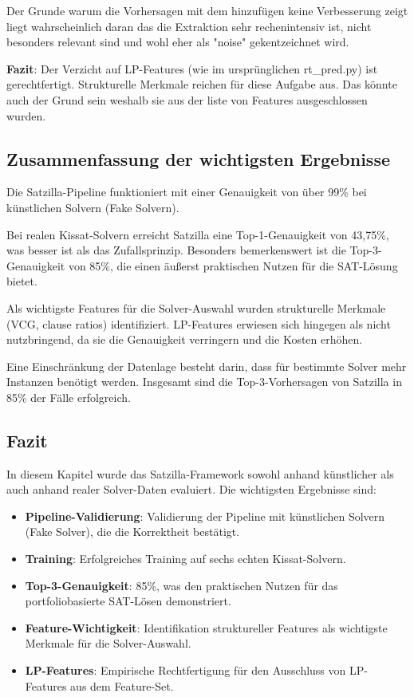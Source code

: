 Der Grunde warum die Vorhersagen mit dem hinzufügen keine Verbesserung zeigt liegt wahrscheinlich daran 
das die Extraktion sehr rechenintensiv ist, nicht besonders relevant sind und wohl eher als "noise" gekentzeichnet wird.

\textbf{Fazit}: Der Verzicht auf LP-Features (wie im ursprünglichen rt\_pred.py) ist gerechtfertigt. Strukturelle 
Merkmale reichen für diese Aufgabe aus. Das könnte auch der Grund sein weshalb sie aus der liste von 
Features ausgeschlossen wurden.

\newpage

\subsection{Zusammenfassung der wichtigsten Ergebnisse}

Die Satzilla-Pipeline funktioniert mit einer Genauigkeit von über 99\% bei künstlichen Solvern (Fake Solvern). 

Bei realen Kissat-Solvern erreicht Satzilla eine Top-1-Genauigkeit von 43,75\%, was besser ist als das Zufallsprinzip. Besonders bemerkenswert ist die Top-3-Genauigkeit von 85\%, die einen äußerst praktischen Nutzen für die SAT-Lösung bietet. 

Als wichtigste Features für die Solver-Auswahl wurden strukturelle Merkmale (VCG, clause ratios) identifiziert. LP-Features erwiesen sich hingegen als nicht nutzbringend, da sie die Genauigkeit verringern und die Kosten erhöhen. 

Eine Einschränkung der Datenlage besteht darin, dass für bestimmte Solver mehr Instanzen benötigt werden. Insgesamt sind die Top-3-Vorhersagen von Satzilla in 85\% der Fälle erfolgreich.

\newpage

\subsection{Fazit}

In diesem Kapitel wurde das Satzilla-Framework sowohl anhand künstlicher als auch anhand realer 
Solver-Daten evaluiert. Die wichtigsten Ergebnisse sind:

\begin{itemize}
    \setlength{\itemsep}{0pt}
    \setlength{\parskip}{0pt}
    \setlength{\parsep}{0pt}
    \item \textbf{Pipeline-Validierung}: Validierung der Pipeline mit künstlichen Solvern (Fake Solver), die die Korrektheit bestätigt.
    \item \textbf{Training}: Erfolgreiches Training auf sechs echten Kissat-Solvern.
    \item \textbf{Top-3-Genauigkeit}: 85\%, was den praktischen Nutzen für das portfoliobasierte SAT-Lösen demonstriert.
    \item \textbf{Feature-Wichtigkeit}: Identifikation struktureller Features als wichtigste Merkmale für die Solver-Auswahl.
    \item \textbf{LP-Features}: Empirische Rechtfertigung für den Ausschluss von LP-Features aus dem Feature-Set.
\end{itemize}

